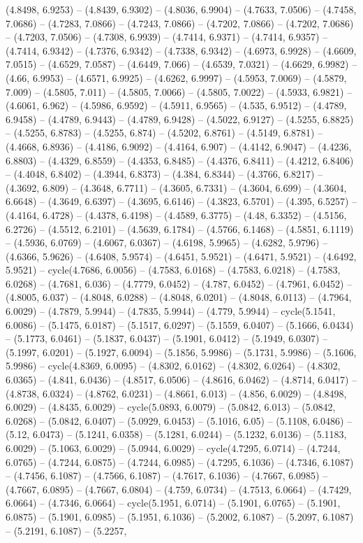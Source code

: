 (4.8498, 6.9253) -- (4.8439, 6.9302) -- (4.8036, 6.9904) -- (4.7633, 7.0506) -- (4.7458, 7.0686) -- (4.7283, 7.0866) -- (4.7243, 7.0866) -- (4.7202, 7.0866) -- (4.7202, 7.0686) -- (4.7203, 7.0506) -- (4.7308, 6.9939) -- (4.7414, 6.9371) -- (4.7414, 6.9357) -- (4.7414, 6.9342) -- (4.7376, 6.9342) -- (4.7338, 6.9342) -- (4.6973, 6.9928) -- (4.6609, 7.0515) -- (4.6529, 7.0587) -- (4.6449, 7.066) -- (4.6539, 7.0321) -- (4.6629, 6.9982) -- (4.66, 6.9953) -- (4.6571, 6.9925) -- (4.6262, 6.9997) -- (4.5953, 7.0069) -- (4.5879, 7.009) -- (4.5805, 7.011) -- (4.5805, 7.0066) -- (4.5805, 7.0022) -- (4.5933, 6.9821) -- (4.6061, 6.962) -- (4.5986, 6.9592) -- (4.5911, 6.9565) -- (4.535, 6.9512) -- (4.4789, 6.9458) -- (4.4789, 6.9443) -- (4.4789, 6.9428) -- (4.5022, 6.9127) -- (4.5255, 6.8825) -- (4.5255, 6.8783) -- (4.5255, 6.874) -- (4.5202, 6.8761) -- (4.5149, 6.8781) -- (4.4668, 6.8936) -- (4.4186, 6.9092) -- (4.4164, 6.907) -- (4.4142, 6.9047) -- (4.4236, 6.8803) -- (4.4329, 6.8559) -- (4.4353, 6.8485) -- (4.4376, 6.8411) -- (4.4212, 6.8406) -- (4.4048, 6.8402) -- (4.3944, 6.8373) -- (4.384, 6.8344) -- (4.3766, 6.8217) -- (4.3692, 6.809) -- (4.3648, 6.7711) -- (4.3605, 6.7331) -- (4.3604, 6.699) -- (4.3604, 6.6648) -- (4.3649, 6.6397) -- (4.3695, 6.6146) -- (4.3823, 6.5701) -- (4.395, 6.5257) -- (4.4164, 6.4728) -- (4.4378, 6.4198) -- (4.4589, 6.3775) -- (4.48, 6.3352) -- (4.5156, 6.2726) -- (4.5512, 6.2101) -- (4.5639, 6.1784) -- (4.5766, 6.1468) -- (4.5851, 6.1119) -- (4.5936, 6.0769) -- (4.6067, 6.0367) -- (4.6198, 5.9965) -- (4.6282, 5.9796) -- (4.6366, 5.9626) -- (4.6408, 5.9574) -- (4.6451, 5.9521) -- (4.6471, 5.9521) -- (4.6492, 5.9521) -- cycle(4.7686, 6.0056) -- (4.7583, 6.0168) -- (4.7583, 6.0218) -- (4.7583, 6.0268) -- (4.7681, 6.036) -- (4.7779, 6.0452) -- (4.787, 6.0452) -- (4.7961, 6.0452) -- (4.8005, 6.037) -- (4.8048, 6.0288) -- (4.8048, 6.0201) -- (4.8048, 6.0113) -- (4.7964, 6.0029) -- (4.7879, 5.9944) -- (4.7835, 5.9944) -- (4.779, 5.9944) -- cycle(5.1541, 6.0086) -- (5.1475, 6.0187) -- (5.1517, 6.0297) -- (5.1559, 6.0407) -- (5.1666, 6.0434) -- (5.1773, 6.0461) -- (5.1837, 6.0437) -- (5.1901, 6.0412) -- (5.1949, 6.0307) -- (5.1997, 6.0201) -- (5.1927, 6.0094) -- (5.1856, 5.9986) -- (5.1731, 5.9986) -- (5.1606, 5.9986) -- cycle(4.8369, 6.0095) -- (4.8302, 6.0162) -- (4.8302, 6.0264) -- (4.8302, 6.0365) -- (4.841, 6.0436) -- (4.8517, 6.0506) -- (4.8616, 6.0462) -- (4.8714, 6.0417) -- (4.8738, 6.0324) -- (4.8762, 6.0231) -- (4.8661, 6.013) -- (4.856, 6.0029) -- (4.8498, 6.0029) -- (4.8435, 6.0029) -- cycle(5.0893, 6.0079) -- (5.0842, 6.013) -- (5.0842, 6.0268) -- (5.0842, 6.0407) -- (5.0929, 6.0453) -- (5.1016, 6.05) -- (5.1108, 6.0486) -- (5.12, 6.0473) -- (5.1241, 6.0358) -- (5.1281, 6.0244) -- (5.1232, 6.0136) -- (5.1183, 6.0029) -- (5.1063, 6.0029) -- (5.0944, 6.0029) -- cycle(4.7295, 6.0714) -- (4.7244, 6.0765) -- (4.7244, 6.0875) -- (4.7244, 6.0985) -- (4.7295, 6.1036) -- (4.7346, 6.1087) -- (4.7456, 6.1087) -- (4.7566, 6.1087) -- (4.7617, 6.1036) -- (4.7667, 6.0985) -- (4.7667, 6.0895) -- (4.7667, 6.0804) -- (4.759, 6.0734) -- (4.7513, 6.0664) -- (4.7429, 6.0664) -- (4.7346, 6.0664) -- cycle(5.1951, 6.0714) -- (5.1901, 6.0765) -- (5.1901, 6.0875) -- (5.1901, 6.0985) -- (5.1951, 6.1036) -- (5.2002, 6.1087) -- (5.2097, 6.1087) -- (5.2191, 6.1087) -- (5.2257, 